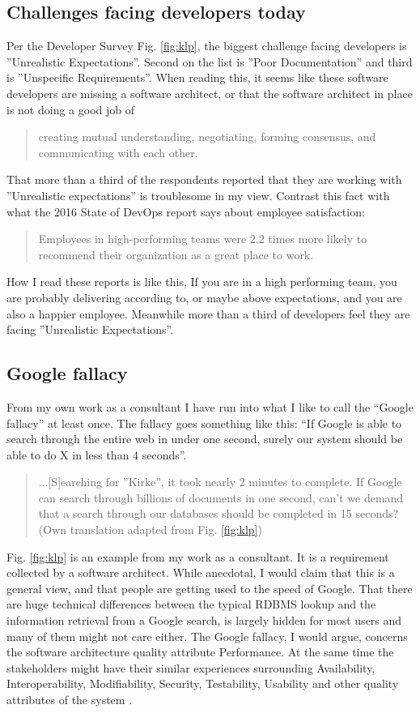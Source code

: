 \documentclass[a4paper, 10pt, conference]{ieeeconf}      %
\begin{document}
\subsection{Challenges facing developers today}
Per the Developer Survey \cite{c6} Fig. \ref{fig:klp}, the biggest challenge facing developers is ''Unrealistic Expectations''.  Second on the list is ''Poor Documentation'' and third is ''Unspecific Requirements''. When reading this, it seems like these software developers are missing a software architect, or that the software architect in place is not doing a good job of \blockquote{creating mutual understanding, negotiating, forming consensus, and communicating with each other\cite{c1}.}
That more than a third of the respondents reported that they are working with ''Unrealistic expectations'' is troublesome in my view. Contrast this fact with what the 2016 State of DevOps report says about employee satisfaction: \blockquote{Employees in high-performing teams were 2.2 times more likely to recommend their organization as a great place to work\cite{c2}.}
How I read these reports is like this, If you are in a high performing team, you are probably delivering according to, or maybe above expectations, and you are also a happier employee. Meanwhile more than a third of developers feel they are facing ''Unrealistic Expectations''. 

\subsection{Google fallacy}
From my own work as a consultant I have run into what I like to call the “Google fallacy” at least once. The fallacy goes something like this: “If Google is able to search through the entire web in under one second, surely our system should be able to do X in less than 4 seconds”.





\blockquote{...[S]earching for ''Kirke'', it took nearly 2 minutes to complete. If Google can search through billions of documents in one second, can’t we demand that a search through our databases should be completed in 15 seconds? (Own translation adapted from Fig. \ref{fig:klp})}


Fig. \ref{fig:klp} is an example from my work as a consultant. It is a requirement collected by a software architect. While anecdotal, I would claim that this is a general view, and that people are getting used to the speed of Google. That there are huge technical differences between the typical RDBMS lookup and the information retrieval from a Google search, is largely hidden for most users and many of them might not care either.
The Google fallacy, I would argue, concerns the software architecture quality attribute Performance.
At the same time the stakeholders might have their similar experiences surrounding Availability, Interoperability, Modifiability, Security, Testability, Usability and other quality attributes of the system \cite{c1}.
\end{document}
